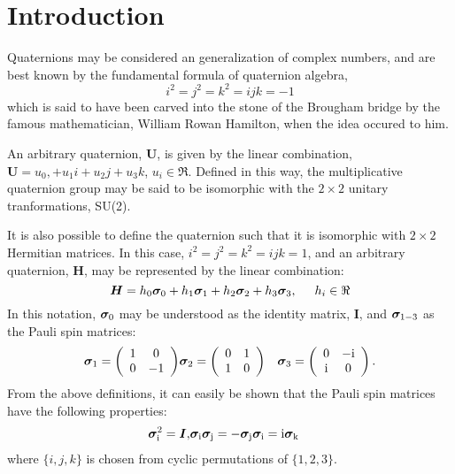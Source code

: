 \documentclass[12pt]{article}
\newcommand{\Ci}{{\rm i}}
\newcommand\pauli[1]{\ensuremath{ \bm{\sigma}_{\rm #1} }}
\begin{document}
\section{Introduction}

Quaternions may be considered an generalization of complex numbers,
and are best known by the fundamental formula of quaternion algebra,
\begin{equation}
i^2=j^2=k^2=ijk=-1
\end{equation}
which is said to have been carved into the stone of the Brougham
bridge by the famous mathematician, William Rowan Hamilton, when the
idea occured to him.

An arbitrary quaternion, $\bm{U}$, is given by the linear combination,
$\bm{U}=u_0,+u_1i+u_2j+u_3k$, $u_i\in\Re$.  Defined in this way, the
multiplicative quaternion group may be said to be isomorphic with the
$2\times2$ unitary tranformations, SU(2).

It is also possible to define the quaternion such that it is isomorphic
with $2\times2$ Hermitian matrices.  In this case, $i^2=j^2=k^2=ijk=1$,
and an arbitrary quaternion, $\bm{H}$, may be represented by the
linear combination:
\begin{equation}
\bm{H}=h_0\pauli{0} + h_1\pauli{1}
	+ h_2\pauli{2} + h_3\pauli{3}, \hspace{5mm} h_i\in\Re
\end{equation}
In this notation, $\pauli{0}$ may be understood as the identity matrix,
$\bm{I}$, and $\pauli{1-3}$ as the Pauli spin matrices:
\begin{eqnarray}
\pauli{1} = \left( \begin{array}{cc}
1 & 0 \\
0 & -1 
\end{array}\right)
&
\pauli{2} = \left( \begin{array}{cc}
0 & 1 \\
1 & 0 
\end{array}\right)
& 
\pauli{3} = \left( \begin{array}{cc}
0 & -\Ci \\
\Ci & 0
\end{array}\right).
\label{pauli}
\end{eqnarray}
From the above definitions, it can easily be shown that the Pauli spin
matrices have the following properties:
\begin{eqnarray}
\pauli{i}^2 = \bm{I}, & \pauli{i}\pauli{j} = -\pauli{j}\pauli{i} = \Ci\pauli{k}
\end{eqnarray}
where $\{i,j,k\}$ is chosen from cyclic permutations of $\{1,2,3\}$.
\end{document}
